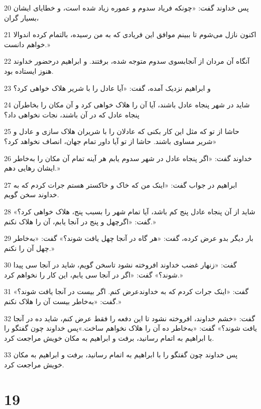 \par 20 پس خداوند گفت: «چونکه فریاد سدوم و عموره زیاد شده است، و خطایای ایشان بسیار گران،
\par 21 اکنون نازل می‌شوم تا ببینم موافق این فریادی که به من رسیده، بالتمام کرده اندوالا خواهم دانست.»
\par 22 آنگاه آن مردان از آنجابسوی سدوم متوجه شده، برفتند. و ابراهیم درحضور خداوند هنوز ایستاده بود.
\par 23 و ابراهیم نزدیک آمده، گفت: «آیا عادل را با شریر هلاک خواهی کرد؟
\par 24 شاید در شهر پنجاه عادل باشند، آیا آن را هلاک خواهی کرد و آن مکان را بخاطرآن پنجاه عادل که در آن باشند، نجات نخواهی داد؟
\par 25 حاشا از تو که مثل این کار بکنی که عادلان را با شریران هلاک سازی و عادل و شریر مساوی باشند. حاشا از تو آیا داور تمام جهان، انصاف نخواهد کرد؟»
\par 26 خداوند گفت: «اگر پنجاه عادل در شهر سدوم یابم هر آینه تمام آن مکان را به‌خاطر ایشان رهایی دهم.»
\par 27 ابراهیم در جواب گفت: «اینک من که خاک و خاکستر هستم جرات کردم که به خداوند سخن گویم.
\par 28 شاید از آن پنجاه عادل پنج کم باشد، آیا تمام شهر را بسبب پنج، هلاک خواهی کرد؟» گفت: «اگر‌چهل و پنج در آنجا یابم، آن را هلاک نکنم.»
\par 29 بار دیگر بدو عرض کرده، گفت: «هر گاه در آنجا چهل یافت شوند؟» گفت: «به‌خاطر چهل آن را نکنم.»
\par 30 گفت: «زنهار غضب خداوند افروخته نشود تاسخن گویم، شاید در آنجا سی پیدا شوند؟» گفت: «اگر در آنجا سی یابم، این کار را نخواهم کرد.»
\par 31 گفت: «اینک جرات کردم که به خداوندعرض کنم. اگر بیست در آنجا یافت شوند؟» گفت: «به‌خاطر بیست آن را هلاک نکنم.»
\par 32 گفت: «خشم خداوند، افروخته نشود تا این دفعه را فقط عرض کنم، شاید ده در آنجا یافت شوند؟» گفت: «به‌خاطر ده آن را هلاک نخواهم ساخت.»پس خداوند چون گفتگو را با ابراهیم به اتمام رسانید، برفت و ابراهیم به مکان خویش مراجعت کرد.
\par 33 پس خداوند چون گفتگو را با ابراهیم به اتمام رسانید، برفت و ابراهیم به مکان خویش مراجعت کرد.
 
\chapter{19}

